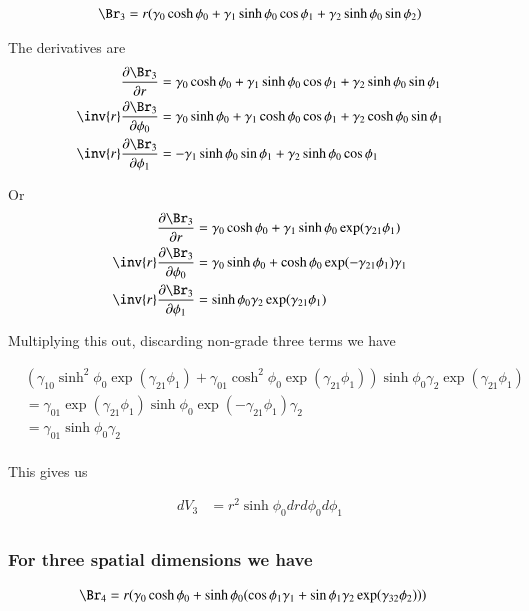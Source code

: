\documentclass{article}
\begin{document}
\begin{align*}
\Br_3 &= r (\gamma_0 \cosh \phi_0 + \gamma_1 \sinh\phi_0 \cos\phi_1 + \gamma_2 \sinh\phi_0 \sin\phi_2 ) \\
\end{align*}

The derivatives are
\begin{align*}
\PD{r}{\Br_3} &= \gamma_0 \cosh \phi_0 + \gamma_1 \sinh\phi_0 \cos\phi_1 + \gamma_2 \sinh\phi_0 \sin\phi_1  \\
\inv{r} \PD{\phi_0}{\Br_3} &= \gamma_0 \sinh \phi_0 + \gamma_1 \cosh\phi_0 \cos\phi_1 + \gamma_2 \cosh\phi_0 \sin\phi_1  \\
\inv{r} \PD{\phi_1}{\Br_3} &= -\gamma_1 \sinh\phi_0 \sin\phi_1 + \gamma_2 \sinh\phi_0 \cos\phi_1 
\end{align*}

Or
\begin{align*}
\PD{r}{\Br_3} &= \gamma_0 \cosh \phi_0 + \gamma_1 \sinh\phi_0 \exp (\gamma_{21} \phi_1 ) \\
\inv{r} \PD{\phi_0}{\Br_3} &= \gamma_0 \sinh \phi_0 + \cosh\phi_0 \exp (-\gamma_{21} \phi_1 ) \gamma_1 \\
\inv{r} \PD{\phi_1}{\Br_3} &= \sinh\phi_0 \gamma_2 \exp(\gamma_{21} \phi_1 )
\end{align*}

Multiplying this out, discarding non-grade three terms we have

\begin{align*}
&(\gamma_{10} \sinh^2\phi_0 \exp (\gamma_{21} \phi_1 ) +\gamma_{01} \cosh^2 \phi_0 \exp (\gamma_{21} \phi_1 ) ) \sinh\phi_0 \gamma_2 \exp(\gamma_{21} \phi_1 ) \\
&=\gamma_{01} \exp (\gamma_{21} \phi_1 ) \sinh\phi_0 \exp(-\gamma_{21} \phi_1 ) \gamma_2 \\
&=\gamma_{01} \sinh\phi_0 \gamma_2 \\
\end{align*}

This gives us

\begin{align*}
dV_3 &= r^2 \sinh\phi_0 dr d\phi_0 d\phi_1 \\
\end{align*}

\subsubsection{ For three spatial dimensions we have }

\begin{align*}
\Br_4 &= r (\gamma_0 \cosh \phi_0 + \sinh\phi_0 ( \cos\phi_1 \gamma_1 + \sin\phi_1 \gamma_2 \exp( \gamma_{32} \phi_2 )) )
\end{align*}
\end{document}
